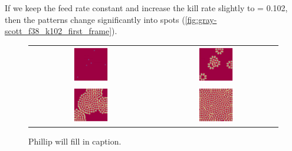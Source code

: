 If we keep the feed rate constant and increase the kill rate slightly to  = 0.102, then the patterns change significantly into spots (\autoref{fig:gray-scott_f38_k102_first_frame}).\\

\begin{figure}[h]
\centering
\mySfFamily
\begin{tabular}{c c}
\includegraphics[width = 0.3\textwidth]{../images/f038_k102_multi_Moment_1.jpg} & \includegraphics[width = 0.3\textwidth]{../images/f038_k102_multi_Moment_2.jpg} \\[2ex]
\includegraphics[width = 0.3\textwidth]{../images/f038_k102_multi_Moment_3.jpg} & \includegraphics[width = 0.3\textwidth]{../images/f038_k102_multi_Moment_4.jpg}
\end{tabular}
\caption{Phillip will fill in caption.}
\label{fig:gray-scott_f38_k102_first_frame}
\end{figure}

